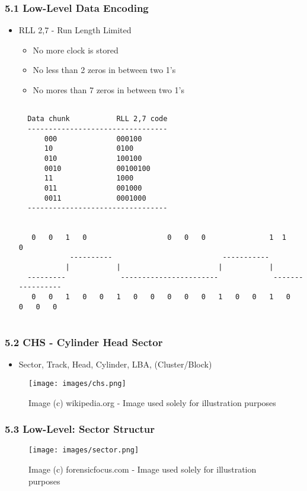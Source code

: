 \begin{frame}[fragile]
  \frametitle{5.1 Low-Level Data Encoding}
        \begin{itemize}
            \item RLL 2,7 - Run Length Limited
            \begin{itemize}
                \item No more clock is stored
		\item No less than 2 zeros in between two 1's
		\item No mores than 7 zeros in between two 1's
            \end{itemize}
\begin{lstlisting}[basicstyle=\tiny]

  Data chunk           RLL 2,7 code
  ---------------------------------
      000              000100
      10               0100
      010              100100
      0010             00100100
      11               1000
      011              001000
      0011             0001000
  ---------------------------------


   0   0   1   0                   0   0   0               1  1            0
            ----------                          -----------
           |           |                       |           |
  ---------             -----------------------             -----------------
   0   0   1   0   0   1   0   0   0   0   0   1   0   0   1   0   0   0   0
			                      
\end{lstlisting}
	\end{itemize}
\end{frame}


\begin{frame}
  \frametitle{5.2 CHS - Cylinder Head Sector}
    \begin{itemize}
        \item[] Sector, Track, Head, Cylinder, LBA, (Cluster/Block)
    \end{itemize}
    \begin{figure}
        \texttt{[image: images/chs.png]}
        \captionsetup{labelformat=empty,labelsep=none}
        \caption[]{\tiny Image (c) wikipedia.org - Image used solely for illustration purposes}
    \end{figure}
\end{frame}


\begin{frame}[fragile]
  \frametitle{5.3 Low-Level: Sector Structur}
    \begin{figure}
        \texttt{[image: images/sector.png]}
        \captionsetup{labelformat=empty,labelsep=none}
        \caption[]{\tiny Image (c) forensicfocus.com - Image used solely for illustration purposes}
    \end{figure}
\end{frame}


